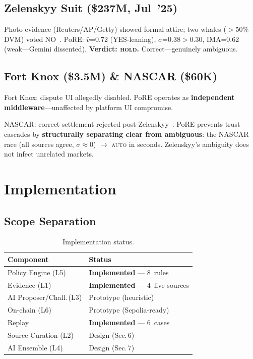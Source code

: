\documentclass[11pt,a4paper,twocolumn]{article}
\begin{document}
\subsection{Zelenskyy Suit (\$237M, Jul~'25)}

Photo evidence (Reuters/AP/Getty) showed formal attire; two whales ($>$50\% DVM) voted NO~\cite{forbes2025}. PoRE: $\bar{v}$=0.72 (YES-leaning), $\sigma$=0.38$>$0.30, IMA=0.62 (weak---Gemini dissented). \textbf{Verdict: \textsc{hold}.} Correct---genuinely ambiguous.

\subsection{Fort Knox (\$3.5M) \& NASCAR (\$60K)}

Fort Knox: dispute UI allegedly disabled. PoRE operates as \textbf{independent middleware}---unaffected by platform UI compromise.

NASCAR: correct settlement rejected post-Zelenskyy~\cite{cryptoslate2025}. PoRE prevents trust cascades by \textbf{structurally separating clear from ambiguous}: the NASCAR race (all sources agree, $\sigma \approx 0$) $\to$ \textsc{auto} in seconds. Zelenskyy's ambiguity does not infect unrelated markets.

\section{Implementation}

\subsection{Scope Separation}

\begin{table}[H]
\centering
\caption{Implementation status.}
\label{tab:scope}
\scriptsize
\begin{tabularx}{\columnwidth}{@{}l>{\raggedright\arraybackslash}X@{}}
\toprule
\textbf{Component} & \textbf{Status} \\
\midrule
Policy Engine (L5) & \textbf{Implemented} --- 8~rules \\
Evidence (L1) & \textbf{Implemented} --- 4~live sources \\
AI Proposer/Chall.\,(L3) & Prototype (heuristic) \\
On-chain (L6) & Prototype (Sepolia-ready) \\
Replay & \textbf{Implemented} --- 6~cases \\
Source Curation (L2) & Design (Sec.\,6) \\
AI Ensemble (L4) & Design (Sec.\,7) \\
\bottomrule
\end{tabularx}
\end{table}
\end{document}
